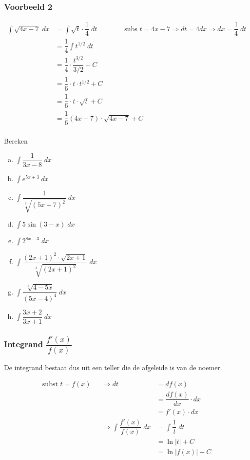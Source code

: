 \documentclass[a4paper,12pt, twoside]{article}
\begin{document}
\subsubsection*{Voorbeeld 2}
\begin{align*}
  \int \sqrt{4x-7} \;dx
  &= \int \sqrt{t} \cdot \dfrac{1}{4} \;dt \qquad\qquad\mbox{subs }t=4x-7 \Rightarrow dt = 4dx \Rightarrow dx = \dfrac{1}{4} \;dt\\
  &= \dfrac{1}{4} \int t^{1/2} \;dt\\
  &= \dfrac{1}{4} \cdot \dfrac{t^{3/2}}{3/2} + C\\
  &= \dfrac{1}{6} \cdot t\cdot t^{1/2} + C\\
  &= \dfrac{1}{6} \cdot t\cdot \sqrt{t} + C\\
  &= \dfrac{1}{6} (4x-7)\cdot \sqrt{4x-7} + C\\
\end{align*}

\begin{oefening}
  Bereken
  \begin{multicols}{2}
  \begin{enumerate}[(a)]
  \item $\displaystyle\int \dfrac{1}{3x-8} \;dx$
  \item $\displaystyle\int e^{5x+3} \;dx$
  \item $\displaystyle\int \dfrac{1}{\sqrt[3]{(5x+7)^2}} \;dx$
  \item $\displaystyle\int 5\sin(3-x) \;dx$
  \item $\displaystyle\int 2^{8x-3} \;dx$
  \item $\displaystyle\int \dfrac{(2x+1)^2 \cdot \sqrt{2x+1}}{\sqrt[3]{(2x+1)^2}} \;dx$
  \item $\displaystyle\int \dfrac{\sqrt[3]{4-5x}}{(5x-4)^4} \;dx$
  \item $\displaystyle\int \dfrac{3x+2}{3x+1} \;dx$
  \end{enumerate}
\end{multicols}
\end{oefening}

\subsubsection{Integrand $\dfrac{f'(x)}{f(x)}$}

De integrand bestaat dus uit een teller die de afgeleide is van de noemer.

\begin{alignat*}{2}
  \mbox{subst } t = f(x) &&\Rightarrow dt &= df(x)\\
  &&               &= \dfrac{df(x)}{dx} \cdot dx \\
  &&               &= f'(x) \cdot dx\\
  &&\Rightarrow \int \dfrac{f'(x)}{f(x)} \;dx &= \int \dfrac{1}{t} \;dt\\
  &&                                          &= \ln |t| + C\\
  &&                                          &= \ln |f(x)| + C
\end{alignat*}
\end{document}
